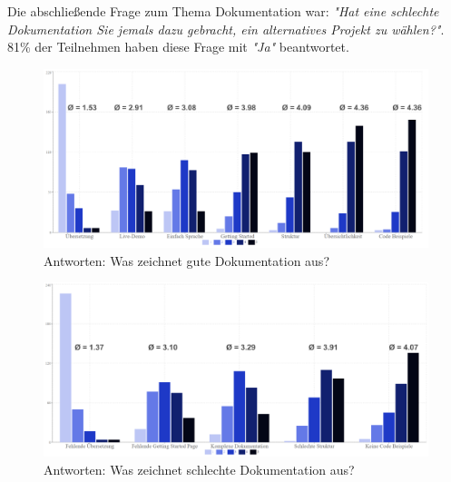 \bigskip
\bigskip
\noindent
Die abschließende Frage zum Thema Dokumentation war: \textit{"Hat eine schlechte Dokumentation Sie jemals
    dazu gebracht, ein alternatives Projekt zu wählen?"}. 81\% der Teilnehmen haben diese Frage mit
\textit{"Ja"} beantwortet. 




\newpage
\begin{figure}[h]
    \centering
    \includegraphics[scale=0.05]{figures/05/GuteDoku_BarChart.png}
    \caption{Antworten: Was zeichnet gute Dokumentation aus?}
    \label{abb:GuteDoku_BarChart}
\end{figure}

\begin{figure}[h]
    \centering
    \includegraphics[scale=0.05]{figures/05/SchlechteDoku_BarChart.png}
    \caption{Antworten: Was zeichnet schlechte Dokumentation aus?}
    \label{abb:SchlechteDoku_BarChart}
\end{figure}